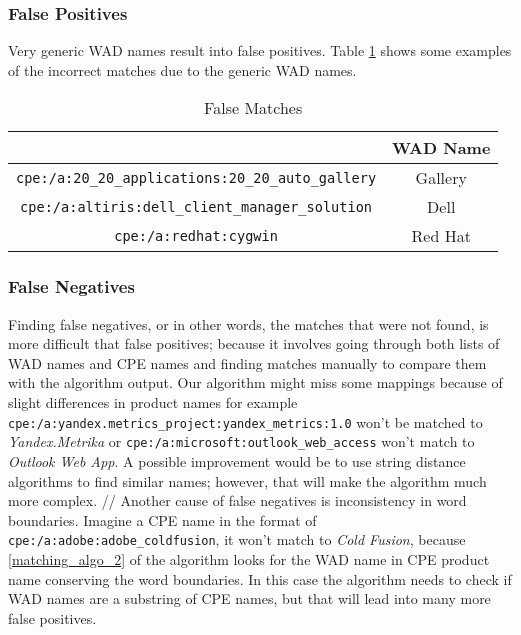 \subsubsection{False Positives}
Very generic WAD names result into false positives. Table \ref{table:false_positives} shows some examples of the incorrect matches due to the generic WAD names. 
\begin{table}
\begin{center}
    \begin{tabular}{ | c | c | }
    
    \hline
	  \hhline{|*2-}
    \multicolumn{1}{|c|}{\cellcolor{LightBlue}\textbf{CPE}} & \multicolumn{1}{|c|}{\cellcolor{LightBlue}\textbf{WAD Name}}  
    \\ \hline
    \texttt{cpe:/a:20\_20\_applications:20\_20\_auto\_gallery} & Gallery
        \\ \hline
    \texttt{cpe:/a:altiris:dell\_client\_manager\_solution} & Dell
        \\ \hline
    \texttt{cpe:/a:redhat:cygwin} & Red Hat
        \\ \hline
    \end{tabular}
    \caption{False Matches}
    \label{table:false_positives}
   \end{center}
\end{table}

\subsubsection{False Negatives}
Finding false negatives, or in other words, the matches that were not found, is more difficult that false positives; because it involves going through both lists of WAD names and CPE names and finding matches manually to compare them with the algorithm output. Our algorithm might miss some mappings because of slight differences in product names for example  \texttt{cpe:/a:yandex.metrics\_project:yandex\_metrics:1.0} won't be matched to \textit{Yandex.Metrika} or \texttt{cpe:/a:microsoft:outlook\_web\_access} won't match to \textit{Outlook Web App}. A possible improvement would be to use string distance algorithms to find similar names; however, that will make the algorithm much more complex.
//
Another cause of false negatives is inconsistency in word boundaries. Imagine a CPE name in the format of \texttt{cpe:/a:adobe:adobe\_coldfusion}, it won't match to \textit{Cold Fusion}, because \ref{matching_algo_2} of the algorithm looks for the WAD name in CPE product name conserving the word boundaries. In this case the algorithm needs to check if WAD names are a substring of CPE names, but that will lead into many more false positives.

